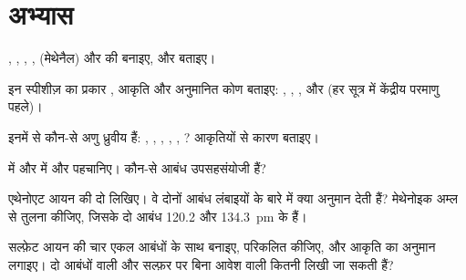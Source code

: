 \section{अभ्यास}

\begin{exercise}[$\star$]\label{exo:b1:lewis-resonance-vsepr:1}
, , , ,
 (मेथेनैल) और  की  बनाइए, और  बताइए।
\end{exercise}

\begin{exercise}[$\star$]\label{exo:b1:lewis-resonance-vsepr:2}
इन स्पीशीज़ का प्रकार , आकृति और अनुमानित कोण बताइए:
, , ,  और  (हर सूत्र में केंद्रीय परमाणु
पहले)।
\end{exercise}

\begin{exercise}[$\star$]\label{exo:b1:lewis-resonance-vsepr:3}
इनमें से कौन-से अणु ध्रुवीय हैं: , , ,
, , ? आकृतियों से कारण बताइए।
\end{exercise}

\begin{exercise}[$\star$]\label{exo:b1:lewis-resonance-vsepr:4}
 में और
 में  और  पहचानिए। कौन-से आबंध उपसहसंयोजी हैं?
\end{exercise}

\begin{exercise}[$\star\star$]\label{exo:b1:lewis-resonance-vsepr:5}
एथेनोएट आयन  की दो  लिखिए। वे दोनों 
आबंध लंबाइयों के बारे में क्या अनुमान देती हैं? मेथेनोइक
अम्ल  से तुलना कीजिए, जिसके दो  आबंध 120.2 और
\qty{134.3}{pm} के हैं।
\end{exercise}

\begin{exercise}[$\star\star$]\label{exo:b1:lewis-resonance-vsepr:6}
सल्फ़ेट आयन  की  चार
एकल  आबंधों के साथ बनाइए,  परिकलित कीजिए, और
आकृति का अनुमान लगाइए। दो  आबंधों वाली और सल्फ़र पर बिना
आवेश वाली कितनी  लिखी जा सकती हैं?
\end{exercise}

